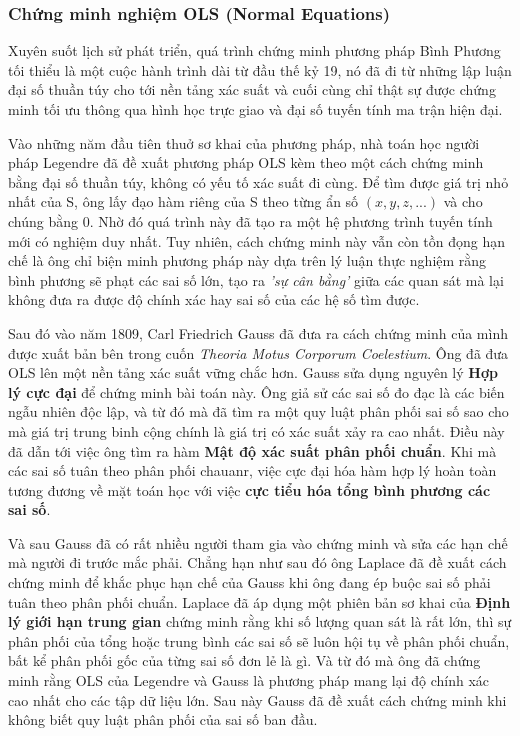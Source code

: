 \subsubsection{Chứng minh nghiệm OLS (Normal Equations)}
Xuyên suốt lịch sử phát triển, quá trình chứng minh phương pháp Bình Phương tối thiểu là một cuộc hành trình dài từ đầu thế kỷ 19, nó đã đi từ những lập luận đại số thuần túy cho tới nền tảng xác suất và cuối cùng chỉ thật sự được chứng minh tối ưu thông qua hình học trực giao và đại số tuyến tính ma trận hiện đại.

Vào những năm đầu tiên thuở sơ khai của phương pháp, nhà toán học người pháp Legendre đã đề xuất phương pháp OLS kèm theo một cách chứng minh bằng đại số thuần túy, không có yếu tố xác suất đi cùng. Để tìm được giá trị nhỏ nhất của S, ông lấy đạo hàm riêng của S theo từng ẩn số $(x, y, z, ...)$ và cho chúng bằng $0$. Nhờ đó quá trình này đã tạo ra một hệ phương trình tuyến tính mới có nghiệm duy nhất. Tuy nhiên, cách chứng minh này vẫn còn tồn đọng hạn chế là ông chỉ biện minh phương pháp này dựa trên lý luận thực nghiệm rằng bình phương sẽ phạt các sai số lớn, tạo ra \textit{'sự cân bằng'} giữa các quan sát \cite{plackett1972} mà lại không đưa ra được độ chính xác hay sai số của các hệ số tìm được.

Sau đó vào năm 1809, Carl Friedrich Gauss đã đưa ra cách chứng minh của mình được xuất bản bên trong cuốn \textit{Theoria Motus Corporum Coelestium}. Ông đã đưa OLS lên một nền tảng xác suất vững chắc hơn. Gauss sửa dụng nguyên lý \textbf{Hợp lý cực đại} để chứng minh bài toán này. Ông giả sử các sai số đo đạc là các biến ngẫu nhiên độc lập, và từ đó mà đã tìm ra một quy luật phân phối sai số sao cho mà giá trị trung binh cộng chính là giá trị có xác suất xảy ra cao nhất. Điều này đã dẫn tới việc ông tìm ra hàm \textbf{Mật độ xác suất phân phối chuẩn}. Khi mà các sai số tuân theo phân phối chauanr, việc cực đại hóa hàm hợp lý hoàn toàn tương đương về mặt toán học với việc \textbf{cực tiểu hóa tổng bình phương các sai số}.

Và sau Gauss đã có rất nhiều người tham gia vào chứng minh và sửa các hạn chế mà người đi trước mắc phải. Chẳng hạn như sau đó ông Laplace đã đề xuất cách chứng minh để khắc phục hạn chế của Gauss khi ông đang ép buộc sai số phải tuân theo phân phối chuẩn. Laplace đã áp dụng một phiên bản sơ khai của \textbf{Định lý giới hạn trung gian} chứng minh rằng khi số lượng quan sát là rất lớn, thì sự phân phối của tổng hoặc trung bình các sai số sẽ luôn hội tụ về phân phối chuẩn, bất kể phân phối gốc của từng sai số đơn lẻ là gì. Và từ đó mà ông đã chứng minh rằng OLS của Legendre và Gauss là phương pháp mang lại độ chính xác cao nhất cho các tập dữ liệu lớn. Sau này Gauss đã đề xuất cách chứng minh khi không biết quy luật phân phối của sai số ban đầu.

